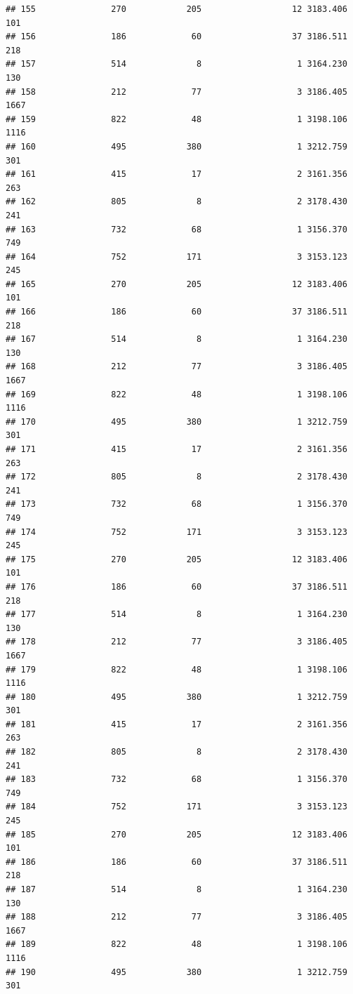 \documentclass[
]{article}
\begin{document}
\begin{verbatim}
## 155               270            205                  12 3183.406  101
## 156               186             60                  37 3186.511  218
## 157               514              8                   1 3164.230  130
## 158               212             77                   3 3186.405 1667
## 159               822             48                   1 3198.106 1116
## 160               495            380                   1 3212.759  301
## 161               415             17                   2 3161.356  263
## 162               805              8                   2 3178.430  241
## 163               732             68                   1 3156.370  749
## 164               752            171                   3 3153.123  245
## 165               270            205                  12 3183.406  101
## 166               186             60                  37 3186.511  218
## 167               514              8                   1 3164.230  130
## 168               212             77                   3 3186.405 1667
## 169               822             48                   1 3198.106 1116
## 170               495            380                   1 3212.759  301
## 171               415             17                   2 3161.356  263
## 172               805              8                   2 3178.430  241
## 173               732             68                   1 3156.370  749
## 174               752            171                   3 3153.123  245
## 175               270            205                  12 3183.406  101
## 176               186             60                  37 3186.511  218
## 177               514              8                   1 3164.230  130
## 178               212             77                   3 3186.405 1667
## 179               822             48                   1 3198.106 1116
## 180               495            380                   1 3212.759  301
## 181               415             17                   2 3161.356  263
## 182               805              8                   2 3178.430  241
## 183               732             68                   1 3156.370  749
## 184               752            171                   3 3153.123  245
## 185               270            205                  12 3183.406  101
## 186               186             60                  37 3186.511  218
## 187               514              8                   1 3164.230  130
## 188               212             77                   3 3186.405 1667
## 189               822             48                   1 3198.106 1116
## 190               495            380                   1 3212.759  301

\end{verbatim}
\end{document}
